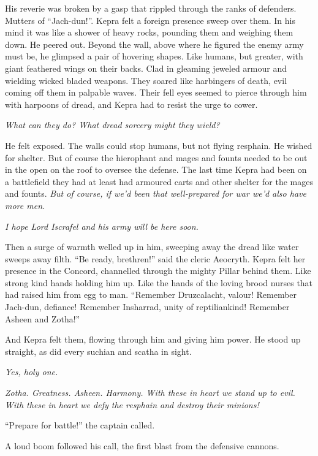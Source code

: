 \documentclass
  [a4paper,
   12pt,
   oneside
  ]%
  {article}
\begin{document}
His reverie was broken by a gasp that rippled through the ranks of defenders. 
Mutters of ``Jach-dun!''. 
Kepra felt a foreign presence sweep over them.
In his mind it was like a shower of heavy rocks, pounding them and weighing them down. 
He peered out. 
Beyond the wall, above where he figured the enemy army must be, he glimpsed a pair of hovering shapes.
Like humans, but greater, with giant feathered wings on their backs. 
Clad in gleaming jeweled armour and wielding wicked bladed weapons. 
They soared like harbingers of death, evil coming off them in palpable waves. 
Their fell eyes seemed to pierce through him with harpoons of dread, and Kepra had to resist the urge to cower. 

\emph{What can they do? What dread sorcery might they wield?} 

He felt exposed. 
The walls could stop humans, but not flying resphain. 
He wished for shelter.
But of course the hierophant and mages and founts needed to be out in the open on the roof to oversee the defense. 
The last time Kepra had been on a battlefield they had at least had armoured carts and other shelter for the mages and founts. 
\emph{But of course, if we'd been that well-prepared for war we'd also have more men.}

\emph{I hope Lord Iscrafel and his army will be here soon.}

Then a surge of warmth welled up in him, sweeping away the dread like water sweeps away filth. 
``Be ready, brethren!'' said the cleric Aeocryth. 
Kepra felt her presence in the Concord, channelled through the mighty Pillar behind them. 
Like strong kind hands holding him up. 
Like the hands of the loving brood nurses that had raised him from egg to man.
``Remember Druzcalacht, valour! Remember Jach-dun, defiance! Remember Insharrad, unity of reptiliankind! Remember Asheen and Zotha!'' 

And Kepra felt them, flowing through him and giving him power. He stood up straight, as did every suchian and scatha in sight. 

\emph{Yes, holy one.}

\emph{Zotha. Greatness. Asheen. Harmony. With these in heart we stand up to evil. With these in heart we defy the resphain and destroy their minions!}

``Prepare for battle!'' the captain called.

A loud boom followed his call, the first blast from the defensive cannons. 
\end{document}

